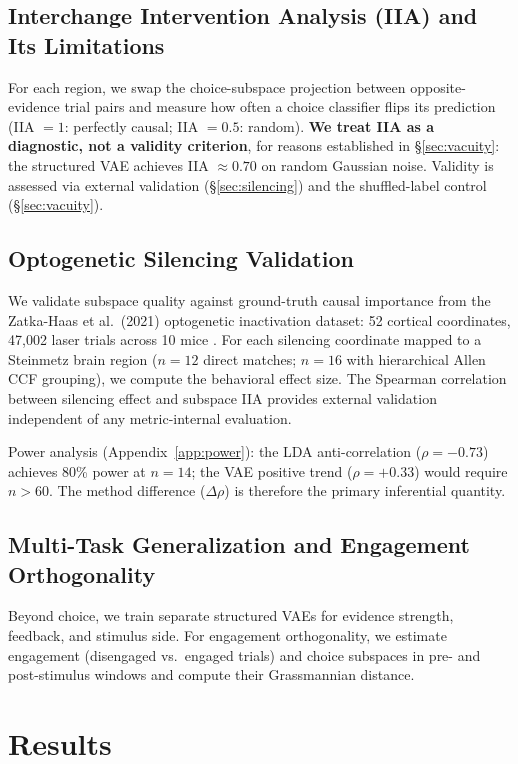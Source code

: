 \documentclass{article}
\begin{document}
\subsection{Interchange Intervention Analysis (IIA) and Its Limitations}

For each region, we swap the choice-subspace projection between opposite-evidence trial pairs and measure how often a choice classifier flips its prediction (IIA $= 1$: perfectly causal; IIA $= 0.5$: random). \textbf{We treat IIA as a diagnostic, not a validity criterion}, for reasons established in \S\ref{sec:vacuity}: the structured VAE achieves IIA $\approx 0.70$ on random Gaussian noise. Validity is assessed via external validation (\S\ref{sec:silencing}) and the shuffled-label control (\S\ref{sec:vacuity}).

\subsection{Optogenetic Silencing Validation}

We validate subspace quality against ground-truth causal importance from the Zatka-Haas et al.\ (2021) optogenetic inactivation dataset: 52 cortical coordinates, 47,002 laser trials across 10 mice \citep{zatkahaas2021spatiotemporal}. For each silencing coordinate mapped to a Steinmetz brain region ($n = 12$ direct matches; $n = 16$ with hierarchical Allen CCF grouping), we compute the behavioral effect size. The Spearman correlation between silencing effect and subspace IIA provides external validation independent of any metric-internal evaluation.

Power analysis (Appendix~\ref{app:power}): the LDA anti-correlation ($\rho = -0.73$) achieves 80\% power at $n = 14$; the VAE positive trend ($\rho = +0.33$) would require $n > 60$. The method difference ($\Delta\rho$) is therefore the primary inferential quantity.

\subsection{Multi-Task Generalization and Engagement Orthogonality}

Beyond choice, we train separate structured VAEs for evidence strength, feedback, and stimulus side. For engagement orthogonality, we estimate engagement (disengaged vs.\ engaged trials) and choice subspaces in pre- and post-stimulus windows and compute their Grassmannian distance.


\section{Results}
\end{document}
